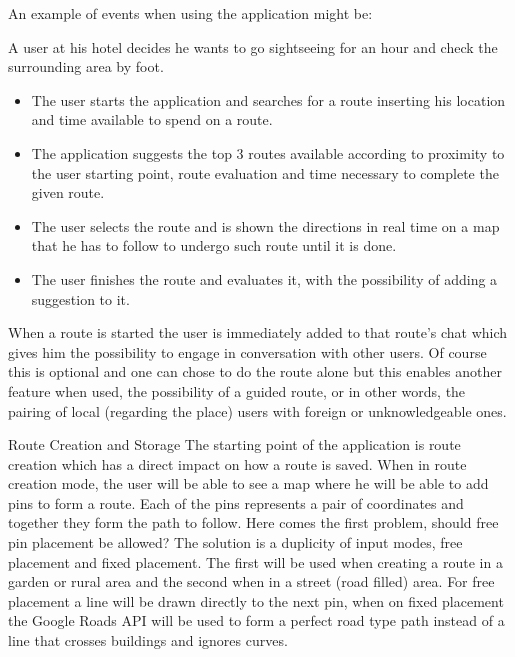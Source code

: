 \documentclass{article}
\begin{document}
        An example of events when using the application might be:

        A user at his hotel decides he wants to go sightseeing for an hour and check the surrounding area by foot.
    
        \begin{itemize}  
            \item The user starts the application and searches for a route inserting his location and time available to spend on a route.
            \item The application suggests the top 3 routes available according to proximity to the user starting point, route evaluation and time necessary to complete the given route. 
            \item The user selects the route and is shown the directions in real time on a map that he has to follow to undergo such route until it is done.
            \item The user finishes the route and evaluates it, with the possibility of adding a suggestion to it. 
        \end{itemize}
    
        When a route is started the user is immediately added to that route's chat which gives him the possibility to engage in conversation with other users.
        Of course this is optional and one can chose to do the route alone but this enables another feature when used, the possibility of a guided route,
        or in other words, the pairing of local (regarding the place) users with foreign or unknowledgeable ones. 
   

        \begin{subsection}{Route Creation and Storage}
            The starting point of the application is route creation which has a direct impact on how a route is saved. When in route creation mode, the user
            will be able to see a map where he will be able to add pins to form a route. Each of the pins represents a pair of coordinates and together
            they form the path to follow. Here comes the first problem, should free pin placement be allowed? The solution is a duplicity of input modes, 
            free placement and fixed placement. The first will be used when creating a route in a garden or rural area and the second when in a street (road filled) area. 
            For free placement a line will be drawn directly to the next pin, when on fixed placement the Google Roads API will be used to form a perfect road 
            type path instead of a line that crosses buildings and ignores curves.           
        \end{subsection}
\end{document}
